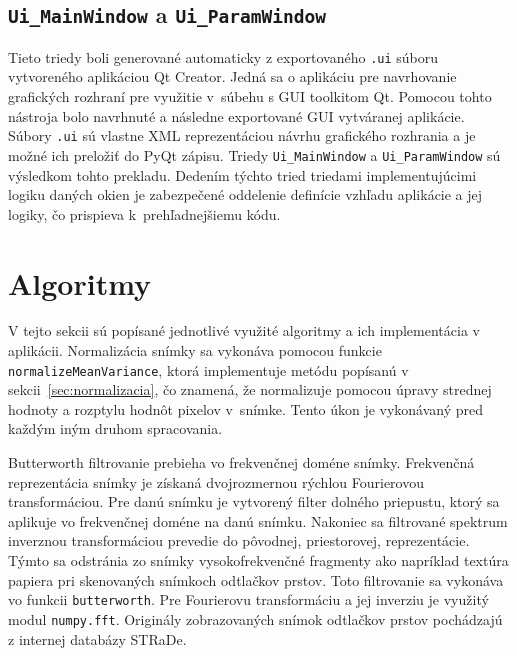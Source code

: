   \subsection{\texttt{Ui\_MainWindow} a \texttt{Ui\_ParamWindow}}
  Tieto triedy boli generované automaticky z exportovaného \texttt{.ui} súboru vytvoreného aplikáciou Qt Creator. Jedná sa o aplikáciu pre navrhovanie
  grafických rozhraní pre využitie v~súbehu s GUI toolkitom Qt. Pomocou tohto nástroja bolo navrhnuté a následne exportované GUI vytváranej aplikácie. Súbory
  \texttt{.ui} sú vlastne XML reprezentáciou návrhu grafického rozhrania a je možné ich preložiť do PyQt zápisu. Triedy \texttt{Ui\_MainWindow}
  a \texttt{Ui\_ParamWindow} sú výsledkom tohto prekladu. Dedením týchto tried triedami implementujúcimi logiku daných okien je zabezpečené oddelenie definície
  vzhľadu aplikácie a jej logiky, čo prispieva k~prehľadnejšiemu kódu.

  \section{Algoritmy} \label{sec:algoritmy}
  V tejto sekcii sú popísané jednotlivé využité algoritmy a ich implementácia v aplikácii.
  Normalizácia snímky sa vykonáva pomocou funkcie \texttt{normalizeMeanVariance}, ktorá implementuje metódu
  popísanú v sekcii~{\ref{sec:normalizacia}}, čo znamená, že normalizuje pomocou úpravy strednej hodnoty a rozptylu hodnôt pixelov v~snímke. Tento úkon je
  vykonávaný pred každým iným druhom spracovania.

  Butterworth filtrovanie prebieha vo frekvenčnej doméne snímky. Frekvenčná reprezentácia snímky je získaná dvojrozmernou rýchlou Fourierovou transformáciou.
  Pre danú snímku je vytvorený filter dolného priepustu, ktorý sa aplikuje vo frekvenčnej doméne na danú snímku. Nakoniec sa filtrované spektrum inverznou
  transformáciou prevedie do pôvodnej, priestorovej, reprezentácie. Týmto sa odstránia zo snímky vysokofrekvenčné fragmenty ako napríklad textúra papiera
  pri skenovaných snímkoch odtlačkov prstov. Toto filtrovanie sa vykonáva vo funkcii \texttt{butterworth}. Pre Fourierovu transformáciu a jej
  inverziu je využitý modul \texttt{numpy.fft}. Originály zobrazovaných snímok odtlačkov prstov pochádzajú z internej databázy STRaDe.

